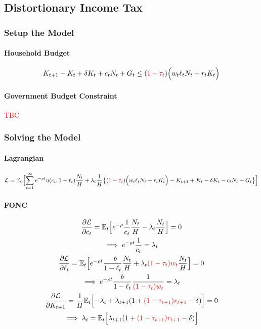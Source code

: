 \documentclass[11pt]{article}
\newcommand{\expat}[2]{\mathbb{E}_{#1}\Big[{#2}\Big]}
\begin{document}
		\subsection{Distortionary Income Tax}
			\subsubsection{Setup the Model}
			\paragraph{Household Budget}
				\begin{equation}
					K_{t+1} - K_t + \delta K_t + c_t N_t + G_t \leq (\textcolor{red}{1-\tau_t}) \Big( w_t \ell_t N_t + r_t K_t \Big)
				\end{equation}
			
			\paragraph{Government Budget Constraint} \textcolor{red}{TBC}
				
			\subsubsection{Solving the Model}	
			\paragraph{Lagrangian}
				\begin{equation}
					\mc{L} = \expat{0}{ \sum_{t=1}^\infty e^{-\rho t} u(c_t, 1 - \ell_t) \frac{N_t}{H} + \lambda_t \frac{1}{H}
						\big \{ (\textcolor{red}{1-\tau_t}) \Big (w_t \ell_t N_t + r_t K_t \Big) - K_{t+1} + K_t - \delta K_t - c_t N_t - G_t \big \}}
				\end{equation}
			
			\paragraph{FONC}
				\begin{gather}
					\pd{\mc{L}}{c_t} = \expat{t}{e^{-\rho} \frac{1}{c_t} \frac{N_t}{H} - \lambda_t \frac{N_t}{H}} = 0 \\
					\implies e^{-\rho t} \frac{1}{c_t} = \lambda_t \\
					\pd{\mc{L}}{\ell_t} = \expat{t}{e^{-\rho t} \frac{-b}{1 - \ell_t} \frac{N_t}{H} + \lambda_t \textcolor{red}{(1-\tau_t) w_t} \frac{N_t}{H}} = 0 \\
					\implies e^{-\rho t} \frac{b}{1-\ell_t} \frac{1}{\textcolor{red}{(1-\tau_t) w_t}}= \lambda_t \\
					\pd{\mc{L}}{K_{t+1}} = \frac{1}{H} \expat{t}{
						- \lambda_t + \lambda_{t+1}(1 + \textcolor{red}{(1 - \tau_{t+1})r_{t+1}} - \delta) 
					} = 0 \\
					\implies \lambda_t = \expat{t}{\lambda_{t+1}(1 + \textcolor{red}{(1 - \tau_{t+1})r_{t+1}} - \delta)}
				\end{gather}
			
\end{document}
